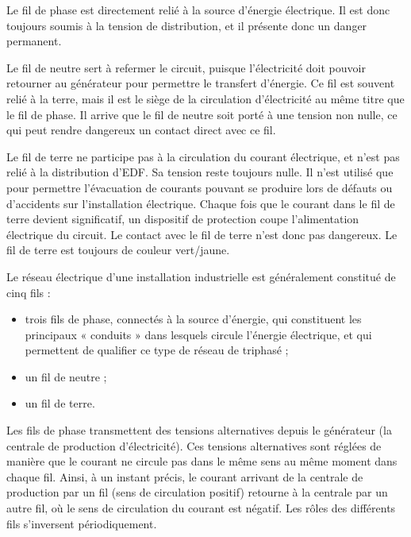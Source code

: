 Le fil de phase est directement relié à la source d’énergie électrique. Il est donc toujours soumis à la tension de distribution, et il présente donc un danger permanent.
\vspace{0.3cm}

Le fil de neutre sert à refermer le circuit, puisque l’électricité doit pouvoir retourner au générateur pour permettre le transfert d’énergie. Ce fil est souvent relié à la terre, mais il est le siège de la circulation d’électricité au même titre que le fil de phase. Il arrive que le fil de neutre soit porté à une tension non nulle, ce qui peut rendre dangereux un contact direct avec ce fil.
\vspace{0.3cm}

Le fil de terre ne participe pas à la circulation du courant électrique, et n’est pas relié à la distribution d’EDF. Sa tension reste toujours nulle. Il n’est utilisé que pour permettre l’évacuation de courants pouvant se produire lors de défauts ou d’accidents sur l’installation électrique. Chaque fois que le courant dans le fil de terre devient significatif, un dispositif de protection coupe l’alimentation électrique du circuit. Le contact avec le fil de terre n’est donc pas dangereux. Le fil de terre est toujours de couleur vert/jaune.

Le réseau électrique d’une installation industrielle est généralement constitué de cinq fils :
\begin{itemize}
\item trois fils de phase, connectés à la source d’énergie, qui constituent les principaux « conduits » dans lesquels circule l’énergie électrique, et qui permettent de qualifier ce type de réseau de triphasé ;
\item un fil de neutre ;
\item un fil de terre.


\end{itemize}

Les fils de phase transmettent des tensions alternatives depuis le générateur (la centrale de production d’électricité). Ces tensions alternatives sont réglées de manière que le courant ne circule pas dans le même sens au même moment dans chaque fil. Ainsi, à un instant précis, le courant arrivant de la centrale de production par un fil (sens de circulation positif) retourne à la centrale par un autre fil, où le sens de circulation du courant est négatif. Les rôles des différents fils s’inversent périodiquement.
\vspace{0.3cm}


